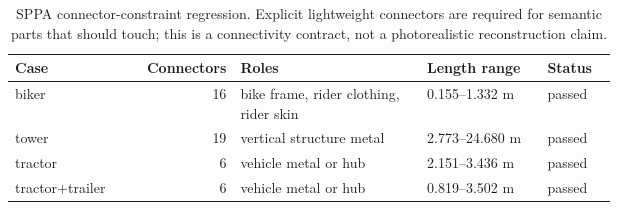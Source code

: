 \begin{table}[H]
\centering
\footnotesize
\setlength{\tabcolsep}{3pt}
\renewcommand{\arraystretch}{1.08}
\caption{SPPA connector-constraint regression. Explicit lightweight connectors are required for semantic parts that should touch; this is a connectivity contract, not a photorealistic reconstruction claim.}
\label{tab:sppa-connector-constraints}
\begin{tabularx}{\linewidth}{@{}L{0.19\linewidth}r L{0.31\linewidth}L{0.20\linewidth}Y@{}}
\toprule
Case & Connectors & Roles & Length range & Status \\
\midrule
biker & 16 & bike frame, rider clothing, rider skin & 0.155--1.332 m & passed \\
tower & 19 & vertical structure metal & 2.773--24.680 m & passed \\
tractor & 6 & vehicle metal or hub & 2.151--3.436 m & passed \\
tractor+trailer & 6 & vehicle metal or hub & 0.819--3.502 m & passed \\
\bottomrule
\end{tabularx}
\end{table}
